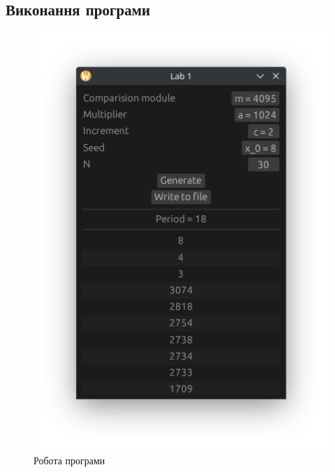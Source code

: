 \documentclass[oneside,14pt]{extarticle}
\begin{document}
\begin{normalsize}
	\subsection*{Виконання програми}
	\begin{figure}[H]
		\centering
		\begin{minipage}{0.45\textwidth}
			\centering
			\includegraphics[scale=0.8]{1}
			\caption{Робота програми}
		\end{minipage}
		\hfill
		\begin{minipage}{0.45\textwidth}
			\centering

\end{minipage}
\end{figure}
\end{normalsize}
\end{document}
